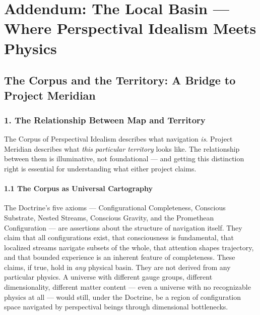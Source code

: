 \chapter*{Addendum: The Local Basin — Where Perspectival Idealism Meets Physics}


\section*{The Corpus and the Territory: A Bridge to Project Meridian}



\bigskip\noindent\makebox[\textwidth]{\color{rulegray}\rule{5cm}{0.3pt}}\bigskip


\subsection*{1. The Relationship Between Map and Territory}


The Corpus of Perspectival Idealism describes what navigation \textit{is}. Project Meridian describes what \textit{this particular territory} looks like. The relationship between them is illuminative, not foundational — and getting this distinction right is essential for understanding what either project claims.


\subsubsection*{1.1 The Corpus as Universal Cartography}


The Doctrine's five axioms — Configurational Completeness, Conscious Substrate, Nested Streams, Conscious Gravity, and the Promethean Configuration — are assertions about the structure of navigation itself. They claim that all configurations exist, that consciousness is fundamental, that localized streams navigate subsets of the whole, that attention shapes trajectory, and that bounded experience is an inherent feature of completeness. These claims, if true, hold in \textit{any} physical basin. They are not derived from any particular physics. A universe with different gauge groups, different dimensionality, different matter content — even a universe with no recognizable physics at all — would still, under the Doctrine, be a region of configuration space navigated by perspectival beings through dimensional bottlenecks.


